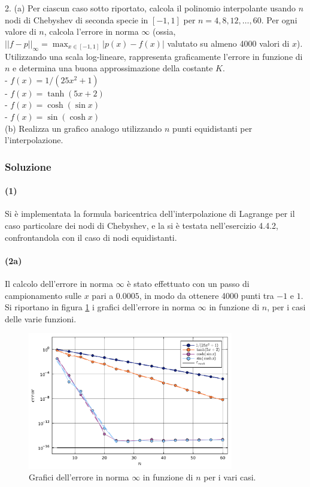 \documentclass[letterpaper, 12pt]{article}
\begin{document}
2. (a) Per ciascun caso sotto riportato, calcola il polinomio interpolante usando $n$ nodi di Chebyshev di 
seconda specie in $[-1,1]$ per $n=4,8,12,\ldots,60$. Per ogni valore di $n$, calcola l'errore in norma $\infty$ 
(ossia, $||f-p||_\infty=\max_{x\in[-1,1]} |p(x)-f(x)|$ valutato su almeno 4000 valori di $x$). 
Utilizzando una scala log-lineare, rappresenta graficamente l'errore in funzione di $n$ e determina una 
buona approssimazione della costante $K$. \\
- $f(x) = 1/(25x^2+1)$  \\ 
- $f(x) = \tanh(5 x+2)$ \\ 
- $f(x) = \cosh(\sin x)$ \\ 
- $f(x) = \sin(\cosh x)$  \\

(b) Realizza un grafico analogo utilizzando $n$ punti equidistanti per l'interpolazione.

\subsubsection{Soluzione}
\paragraph{(1) } Si è implementata la formula baricentrica dell'interpolazione di Lagrange per il caso
particolare dei nodi di Chebyshev, e la si è testata nell'esercizio 4.4.2, confrontandola con il caso di 
nodi equidistanti. \\
\paragraph{(2a) } Il calcolo dell'errore in norma $\infty$ è stato effettuato con un passo di campionamento
sulle $x$ pari a $0.0005$, in modo da ottenere 4000 punti tra $-1$ e $1$. Si riportano in figura \ref{fig:es4_4_2_1} 
i grafici dell'errore in norma $\infty$ in funzione di $n$, per i casi delle varie funzioni.
\begin{figure}[!ht]
    \centering
    \includegraphics[width=0.8\textwidth]{4421.pdf}
    \caption{Grafici dell'errore in norma $\infty$ in funzione di $n$ per i vari casi.}
    \label{fig:es4_4_2_1}
\end{figure}
\end{document}
